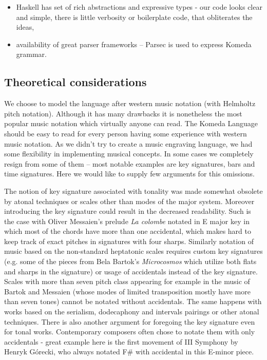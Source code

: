 \documentclass{article}
\begin{document}
\begin{itemize}
  \item Haskell \cite{haskell} has set of rich abstractions and expressive
    types - our code looks clear and simple, there is little verbosity or
    boilerplate code, that obliterates the ideas,
  \item availability of great parser frameworks -- Parsec \cite{parsec} is used
    to express Komeda grammar.
\end{itemize}

\subsection{Theoretical considerations}
\label{lang:theory}

We choose to model the language after western music notation (with Helmholtz pitch notation).
Although it has many drawbacks it is nonetheless the most popular
music notation which virtually anyone can read. The Komeda Language should be
easy to read for every person having some experience with western music notation.
As we didn't try to create a music engraving language, we had some flexibility in
implementing musical concepts. In some cases we completely resign from some of
them -- most notable examples are key signatures, bars and time signatures.
Here we would like to supply few arguments for this omissions.

The notion of key signature associated with tonality was made somewhat obsolete
by atonal techniques or scales other than modes of the major system. Moreover
introducing the key signature could result in the decreased readability. Such
is the case with Oliver Messaien's prelude {\it La colombe} notated in E major
key in which most of the chords have more than one accidental, which makes hard
to keep track of exact pitches in signatures with four sharps.  Similarly
notation of music based on the non-standard heptatonic scales requires custom
key signatures (e.g. some of the pieces from Bela Bartok's {\it Microcosmos}
which utilize both flats and sharps in the signature) or usage of accidentals
instead of the key signature.  Scales with more than seven pitch class
appearing for example  in the music of Bartok \cite{bela1} \cite{bela2} and
Messaien (whose modes of limited transposition \cite{mess} mostly have more
than seven tones) cannot be notated without accidentals. The same happens with
works based on the serialism, dodecaphony and intervals pairings \cite{lutos}
or other atonal techniques. There is also another argument for foregoing the
key signature even for tonal works. Contemporary composers often chose to
notate them with only accidentals - great example here is the first movement of
III Symphony by Henryk G\'{o}recki, who always notated F\# with accidental in
this E-minor piece.
\end{document}
